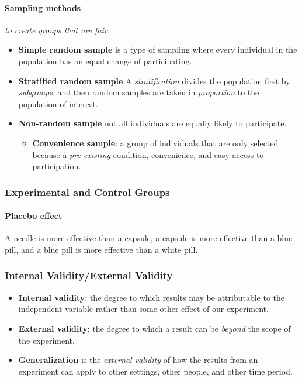 \documentclass{article}
\begin{document}
 	\paragraph{Sampling methods} \emph{to create groups that are fair.}
 	\begin{itemize}
 		\item \textbf{Simple random sample} is a type of sampling where every individual in the population has an equal change of participating.
 		\item \textbf{Stratified random sample} A \emph{stratification} divides the population first by \emph{subgroups}, and then random samples are taken in \emph{proportion} to the population of interest.
 		\item \textbf{Non-random sample} not all individuals are equally likely to participate.
 		\begin{itemize}
 			\item \textbf{Convenience sample}: a group of individuals that are only selected because a \emph{pre-existing} condition, convenience, and easy access to participation.
 		\end{itemize}
 	\end{itemize}
 	\subsubsection{Experimental and Control Groups}
 	\paragraph{Placebo effect} A needle is more effective than a capsule, a capsule is more effective than a blue pill, and a blue pill is more effective than a white pill.
 	\subsubsection{Internal Validity/External Validity}
 	\begin{itemize}
 		\item \textbf{Internal validity}: the degree to which results may be attributable to the independent variable rather than some other effect of our experiment.
 		\item \textbf{External validity}: the degree to which a result can be \emph{beyond} the scope of the experiment.
 		\item \textbf{Generalization} is the \emph{external validity} of how the results from an experiment can apply to other settings, other people, and other time period.
 	\end{itemize}
\end{document}
